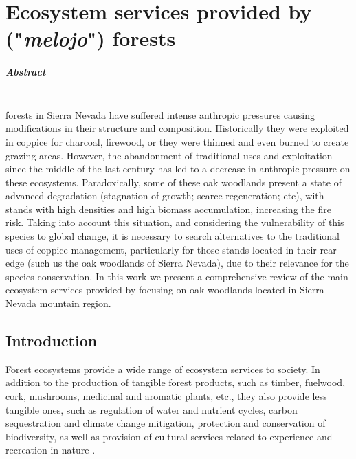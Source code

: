 %
\chapter{\textcolor{ctcolormain}{Ecosystem services provided by \Qpw ("\textit{melojo}") forests}}\label{sec:es}

\mbox{}
\vfill


\newpage

\paragraph{Abstract} \mbox{} \\
\Qp forests in Sierra Nevada have suffered intense anthropic pressures causing modifications in their structure and composition. Historically they were exploited in coppice for charcoal, firewood, or they were thinned and even burned to create grazing areas. However, the abandonment of traditional uses and exploitation since the middle of the last century has led to a decrease in anthropic pressure on these ecosystems. Paradoxically, some of these oak woodlands present a state of advanced degradation (stagnation of growth; scarce regeneration; etc), with stands with high densities and high biomass accumulation, increasing the fire risk. Taking into account this situation, and considering the vulnerability of this species to global change, it is necessary to search alternatives to the traditional uses of coppice management, particularly for those stands located in their rear edge (such us the oak woodlands of Sierra Nevada), due to their relevance for the species conservation. 
In this work we present a comprehensive review of the main ecosystem services provided by \Qpy focusing on oak woodlands located in Sierra Nevada mountain region.
\newpage

\section{Introduction}\label{sec:es:intro}

Forest ecosystems provide a wide range of ecosystem services to society. In addition to the production of tangible forest products, such as timber, fuelwood, cork, mushrooms, medicinal and aromatic plants, etc., they also provide less tangible ones, such as regulation of water and nutrient cycles, carbon sequestration and climate change mitigation, protection and conservation of biodiversity, as well as provision of cultural services related to experience and recreation in nature \autocite{Acharyaetal2019GlobalTrend,Baetenetal2019IdentifyingTree,deGrootetal2002TypologyClassification,FelipeLuciaetal2018MultipleForest,Gamfeldtetal2013HigherLevels,Iversonetal2018EcosystemServices,Stengeretal2009ValuingEnvironmental}. 

